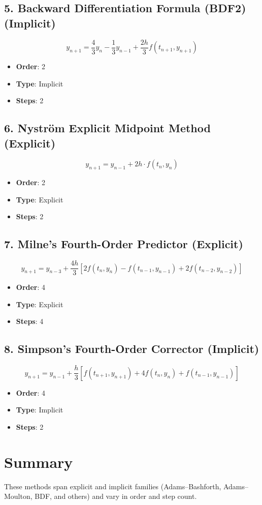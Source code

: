 \documentclass{article}
\begin{document}
\subsection*{5. Backward Differentiation Formula (BDF2) (Implicit)}
\[
y_{n+1} = \frac{4}{3}y_n - \frac{1}{3}y_{n-1} + \frac{2h}{3}f(t_{n+1}, y_{n+1})
\]
\begin{itemize}
    \item \textbf{Order}: 2
    \item \textbf{Type}: Implicit
    \item \textbf{Steps}: 2
\end{itemize}

\subsection*{6. Nyström Explicit Midpoint Method (Explicit)}
\[
y_{n+1} = y_{n-1} + 2h \cdot f(t_n, y_n)
\]
\begin{itemize}
    \item \textbf{Order}: 2
    \item \textbf{Type}: Explicit
    \item \textbf{Steps}: 2
\end{itemize}

\subsection*{7. Milne's Fourth-Order Predictor (Explicit)}
\[
y_{n+1} = y_{n-3} + \frac{4h}{3} \left[ 2f(t_n, y_n) - f(t_{n-1}, y_{n-1}) + 2f(t_{n-2}, y_{n-2}) \right]
\]
\begin{itemize}
    \item \textbf{Order}: 4
    \item \textbf{Type}: Explicit
    \item \textbf{Steps}: 4
\end{itemize}

\subsection*{8. Simpson's Fourth-Order Corrector (Implicit)}
\[
y_{n+1} = y_{n-1} + \frac{h}{3} \left[ f(t_{n+1}, y_{n+1}) + 4f(t_n, y_n) + f(t_{n-1}, y_{n-1}) \right]
\]
\begin{itemize}
    \item \textbf{Order}: 4
    \item \textbf{Type}: Implicit
    \item \textbf{Steps}: 2
\end{itemize}

\section*{Summary}
These methods span explicit and implicit families (Adams–Bashforth, Adams–Moulton, BDF, and others) and vary in order and step count.
\end{document}
